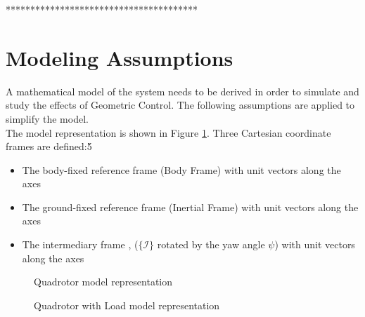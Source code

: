 ***************************************\\

\section{Modeling Assumptions} 
A mathematical model of the system needs to be derived in order to simulate and study the effects of Geometric Control. 
The following assumptions are applied to simplify the model.\\

The  model representation is shown in Figure \ref{fig:mod.model}. Three Cartesian coordinate frames are defined:\v{5}
\begin{itemize}
	\setlength\itemsep{.2pt}
	\item The body-fixed reference frame  (Body Frame)
	\subitem with unit vectors  along the axes
	\item The ground-fixed reference frame  (Inertial Frame)
	\subitem with unit vectors  along the axes								
	\item The intermediary frame , ($ \{\mathcal{I} \}$ rotated by the yaw angle $ \psi $) 
	\subitem with unit vectors  along the axes								
\end{itemize}

\begin{figure}[h!]
	\centering
	\caption{Quadrotor model representation\label{fig:mod.model}}
\end{figure}	

\begin{figure}[h!]
	\centering
	\caption{Quadrotor with Load model representation\label{fig:mod.modelQRL}}
\end{figure}	

